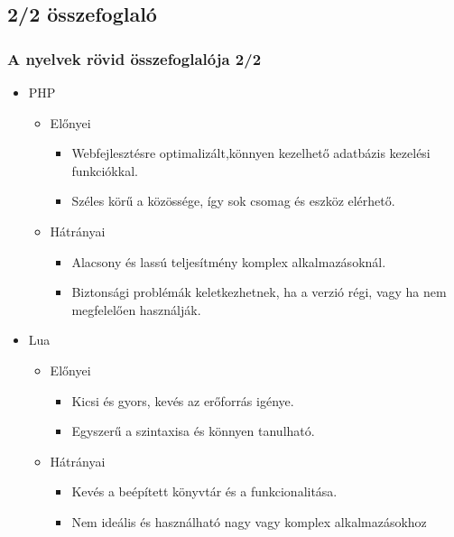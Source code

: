 \documentclass[10pt]{beamer}
\begin{document}
	\subsection{2/2 összefoglaló}
	\begin{frame}
		\frametitle{A nyelvek rövid összefoglalója 2/2}

		\begin{itemize}
			\item PHP
				\begin{itemize}
					\item Előnyei
						\begin{itemize}
							\item Webfejlesztésre optimalizált,könnyen kezelhető adatbázis kezelési
								funkciókkal.

							\item Széles körű a közössége, így sok csomag és eszköz elérhető.
						\end{itemize}

					\item Hátrányai
						\begin{itemize}
							\item Alacsony és lassú teljesítmény komplex alkalmazásoknál.

							\item Biztonsági problémák keletkezhetnek, ha a verzió régi, vagy ha
								nem megfelelően használják.
						\end{itemize}
				\end{itemize}

			\item Lua
				\begin{itemize}
					\item Előnyei
						\begin{itemize}
							\item Kicsi és gyors, kevés az erőforrás igénye.

							\item Egyszerű a szintaxisa és könnyen tanulható.
						\end{itemize}

					\item Hátrányai
						\begin{itemize}
							\item Kevés a beépített könyvtár és a funkcionalitása.

							\item Nem ideális és használható nagy vagy komplex alkalmazásokhoz
						\end{itemize}
				\end{itemize}
		\end{itemize}
	\end{frame}
	
\end{document}
